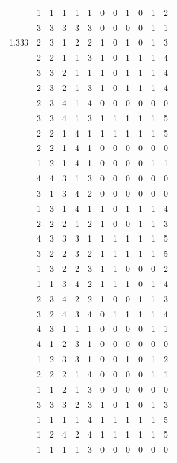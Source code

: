 \documentclass[]{msu-thesis}
\theoremstyle{definition}
\theoremstyle{definition}
\theoremstyle{definition}
\theoremstyle{remark}
\begin{document}
\begin{table}
{\begin{tabular}[t]{rrrrrrrrrrrr}
 & 1 & 1 & 1 & 1 & 1 & 0 & 0 & 1 & 0 & 1 & 2\\
 & 3 & 3 & 3 & 3 & 3 & 0 & 0 & 0 & 0 & 1 & 1\\
1.333 & 2 & 3 & 1 & 2 & 2 & 1 & 0 & 1 & 0 & 1 & 3\\
 & 2 & 2 & 1 & 1 & 3 & 1 & 0 & 1 & 1 & 1 & 4\\
 & 3 & 3 & 2 & 1 & 1 & 1 & 0 & 1 & 1 & 1 & 4\\
 & 2 & 3 & 2 & 1 & 3 & 1 & 0 & 1 & 1 & 1 & 4\\
 & 2 & 3 & 4 & 1 & 4 & 0 & 0 & 0 & 0 & 0 & 0\\
 & 3 & 3 & 4 & 1 & 3 & 1 & 1 & 1 & 1 & 1 & 5\\
 & 2 & 2 & 1 & 4 & 1 & 1 & 1 & 1 & 1 & 1 & 5\\
 & 2 & 2 & 1 & 4 & 1 & 0 & 0 & 0 & 0 & 0 & 0\\
 & 1 & 2 & 1 & 4 & 1 & 0 & 0 & 0 & 0 & 1 & 1\\
 & 4 & 4 & 3 & 1 & 3 & 0 & 0 & 0 & 0 & 0 & 0\\
 & 3 & 1 & 3 & 4 & 2 & 0 & 0 & 0 & 0 & 0 & 0\\
 & 1 & 3 & 1 & 4 & 1 & 1 & 0 & 1 & 1 & 1 & 4\\
 & 2 & 2 & 2 & 1 & 2 & 1 & 0 & 0 & 1 & 1 & 3\\
 & 4 & 3 & 3 & 3 & 1 & 1 & 1 & 1 & 1 & 1 & 5\\
 & 3 & 2 & 2 & 3 & 2 & 1 & 1 & 1 & 1 & 1 & 5\\
 & 1 & 3 & 2 & 2 & 3 & 1 & 1 & 0 & 0 & 0 & 2\\
 & 1 & 1 & 3 & 4 & 2 & 1 & 1 & 1 & 0 & 1 & 4\\
 & 2 & 3 & 4 & 2 & 2 & 1 & 0 & 0 & 1 & 1 & 3\\
 & 3 & 2 & 4 & 3 & 4 & 0 & 1 & 1 & 1 & 1 & 4\\
 & 4 & 3 & 1 & 1 & 1 & 0 & 0 & 0 & 0 & 1 & 1\\
 & 4 & 1 & 2 & 3 & 1 & 0 & 0 & 0 & 0 & 0 & 0\\
 & 1 & 2 & 3 & 3 & 1 & 0 & 0 & 1 & 0 & 1 & 2\\
 & 2 & 2 & 2 & 1 & 4 & 0 & 0 & 0 & 0 & 1 & 1\\
 & 1 & 1 & 2 & 1 & 3 & 0 & 0 & 0 & 0 & 0 & 0\\
 & 3 & 3 & 3 & 2 & 3 & 1 & 0 & 1 & 0 & 1 & 3\\
 & 1 & 1 & 1 & 1 & 4 & 1 & 1 & 1 & 1 & 1 & 5\\
 & 1 & 2 & 4 & 2 & 4 & 1 & 1 & 1 & 1 & 1 & 5\\
 & 1 & 1 & 1 & 1 & 3 & 0 & 0 & 0 & 0 & 0 & 0\\

\end{tabular}}
\end{table}
\end{document}
